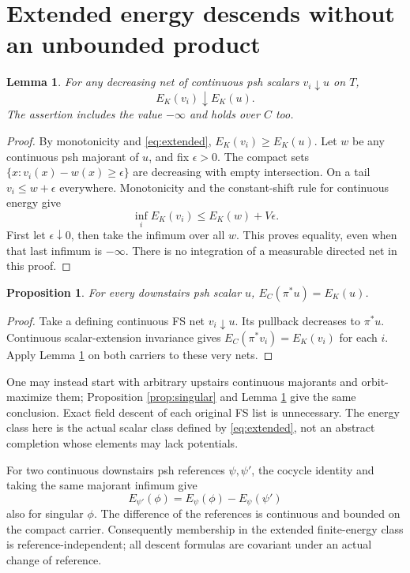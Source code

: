 \documentclass[11pt]{article}
\newtheorem{lemma}[theorem]{Lemma}
\newtheorem{proposition}[theorem]{Proposition}
\theoremstyle{remark}
\begin{document}
\section{Extended energy descends without an unbounded product}

\begin{lemma}\label{lem:energy-net}
For any decreasing net of continuous psh scalars $v_i\downarrow u$
on $T$,
\[
 E_K(v_i)\downarrow E_K(u).
\]
The assertion includes the value $-\infty$ and holds over $C$ too.
\end{lemma}
\begin{proof}
By monotonicity and \eqref{eq:extended}, $E_K(v_i)\geq E_K(u)$.
Let $w$ be any continuous psh majorant of $u$, and fix
$\epsilon>0$. The compact sets
$\{x:v_i(x)-w(x)\geq\epsilon\}$ are decreasing with empty
intersection. On a tail $v_i\leq w+\epsilon$ everywhere.
Monotonicity and the constant-shift rule for continuous energy give
\[
 \inf_i E_K(v_i)\leq E_K(w)+V\epsilon.
\]
First let $\epsilon\downarrow0$, then take the infimum over all $w$.
This proves equality, even when that last infimum is $-\infty$.
There is no integration of a measurable directed net in this proof.
\end{proof}

\begin{proposition}\label{prop:energy}
For every downstairs psh scalar $u$,
$E_C(\pi^*u)=E_K(u)$.
\end{proposition}
\begin{proof}
Take a defining continuous FS net $v_i\downarrow u$. Its pullback
decreases to $\pi^*u$. Continuous scalar-extension invariance gives
$E_C(\pi^*v_i)=E_K(v_i)$ for each $i$. Apply Lemma
\ref{lem:energy-net} on both carriers to these very nets.
\end{proof}

One may instead start with arbitrary upstairs continuous majorants
and orbit-maximize them; Proposition \ref{prop:singular} and Lemma
\ref{lem:energy-net} give the same conclusion. Exact field descent
of each original FS list is unnecessary. The energy class here is the
actual scalar class defined by \eqref{eq:extended}, not an abstract
completion whose elements may lack potentials.

For two continuous downstairs psh references $\psi,\psi'$, the cocycle
identity and taking the same majorant infimum give
\[
 E_{\psi'}(\phi)=E_\psi(\phi)-E_\psi(\psi')
\]
also for singular $\phi$. The difference of the references is
continuous and bounded on the compact carrier. Consequently membership
in the extended finite-energy class is reference-independent; all
descent formulas are covariant under an actual change of reference.
\end{document}
